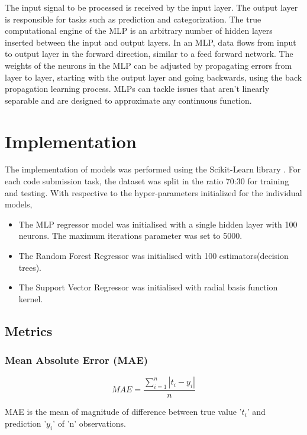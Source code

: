 \documentclass[conference]{IEEEtran}
\begin{document}
The input signal to be processed is received by the input layer. The output layer is responsible for tasks such as prediction and categorization. The true computational engine of the MLP is an arbitrary number of hidden layers inserted between the input and output layers. In an MLP, data flows from input to output layer in the forward direction, similar to a feed forward network. The weights of the neurons in the MLP can be adjusted by propagating errors from layer to layer, starting with the output layer and going backwards, using the back propagation learning process. MLPs can tackle issues that aren't linearly separable and are designed to approximate any continuous function.

\section{Implementation}

The implementation of models was performed using the Scikit-Learn library \cite{E}. For each code submission task, the dataset was split in the ratio 70:30 for training and testing. With respective to the hyper-parameters initialized for the individual models, 

\begin{itemize}
    \item The MLP regressor model was initialised with a single hidden layer with 100 neurons. The maximum iterations parameter was set to 5000. 
    \item The Random Forest Regressor was initialised with 100 estimators(decision trees).
    \item The Support Vector Regressor was initialised with radial basis function kernel.
\end{itemize} 


\subsection{Metrics}
 

\subsubsection{\textbf{Mean Absolute Error (MAE)}}

\[ MAE = \frac{\sum_{i=1}^{n}|t_i-y_i|}{n} \]

MAE is the mean of magnitude of difference between true value '$t_{i}$' and prediction '$y_{i}$' of 'n' observations.
\end{document}
